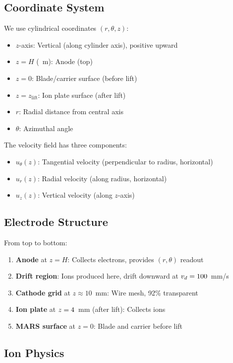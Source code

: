 \documentclass[11pt,a4paper]{article}
\begin{document}
\subsection{Coordinate System}

We use cylindrical coordinates $(r, \theta, z)$:
\begin{itemize}[nosep]
  \item $z$-axis: Vertical (along cylinder axis), positive upward
  \item $z = H$ (\Hcyl~m): Anode (top)
  \item $z = 0$: Blade/carrier surface (before lift)
  \item $z = z_\mathrm{lift}$: Ion plate surface (after lift)
  \item $r$: Radial distance from central axis
  \item $\theta$: Azimuthal angle
\end{itemize}

The velocity field has three components:
\begin{itemize}[nosep]
  \item $u_\theta(z)$: Tangential velocity (perpendicular to radius, horizontal)
  \item $u_r(z)$: Radial velocity (along radius, horizontal)
  \item $u_z(z)$: Vertical velocity (along $z$-axis)
\end{itemize}

\subsection{Electrode Structure}

From top to bottom:
\begin{enumerate}[nosep]
  \item \textbf{Anode} at $z = H$: Collects electrons, provides $(r,\theta)$ readout
  \item \textbf{Drift region}: Ions produced here, drift downward at $v_d = 100$~mm/s
  \item \textbf{Cathode grid} at $z \approx 10$~mm: Wire mesh, 92\% transparent
  \item \textbf{Ion plate} at $z = 4$~mm (after lift): Collects ions
  \item \textbf{MARS surface} at $z = 0$: Blade and carrier before lift
\end{enumerate}

\subsection{Ion Physics}
\end{document}
